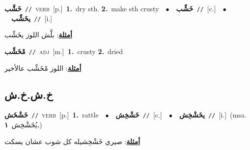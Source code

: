 \documentclass[10pt,a4paper,twoside]{article} %
\begin{document}
\begin{multicols}{2}
{\setlength\topsep{0pt}\textbf{\foreignlanguage{arabic}{خَشَّب}}\ {\color{gray}\texttt{//}\color{black}}\ \textsc{verb}\ [p.]\ \textbf{1.}~dry sth.  \textbf{2.}~make sth crusty\ \ $\bullet$\ \ \setlength\topsep{0pt}\textbf{\foreignlanguage{arabic}{خَشِّب}}\ {\color{gray}\texttt{//}\color{black}}\ [c.]\ \ $\bullet$\ \ \setlength\topsep{0pt}\textbf{\foreignlanguage{arabic}{يخَشِّب}}\ {\color{gray}\texttt{//}\color{black}}\ [i.]\  \begin{flushright}\color{gray}\foreignlanguage{arabic}{\textbf{\underline{\foreignlanguage{arabic}{أمثلة}}}: بلَّش اللوز يخَشِّب}\end{flushright}\color{black}} \vspace{2mm}

{\setlength\topsep{0pt}\textbf{\foreignlanguage{arabic}{مْخَشِّب}}\ {\color{gray}\texttt{//}\color{black}}\ \textsc{adj}\ [m.]\ \textbf{1.}~crusty  \textbf{2.}~dried\  \begin{flushright}\color{gray}\foreignlanguage{arabic}{\textbf{\underline{\foreignlanguage{arabic}{أمثلة}}}: اللوز مْخَشِّب عالأخير}\end{flushright}\color{black}} \vspace{2mm}

\vspace{-3mm}
\subsection*{\color{blue}\foreignlanguage{arabic}{خ.ش.خ.ش}\color{blue}{}} 

{\setlength\topsep{0pt}\textbf{\foreignlanguage{arabic}{خَشْخَش}}\ {\color{gray}\texttt{//}\color{black}}\ \textsc{verb}\ [p.]\ \textbf{1.}~rattle\ \ $\bullet$\ \ \setlength\topsep{0pt}\textbf{\foreignlanguage{arabic}{خَشْخِش}}\ {\color{gray}\texttt{//}\color{black}}\ [c.]\ \ $\bullet$\ \ \setlength\topsep{0pt}\textbf{\foreignlanguage{arabic}{يخَشْخِش}}\ {\color{gray}\texttt{//}\color{black}}\ [i.]\ \color{gray}(msa. \foreignlanguage{arabic}{يُخَشْخِش}~\foreignlanguage{arabic}{\textbf{١.}})\color{black}\  \begin{flushright}\color{gray}\foreignlanguage{arabic}{\textbf{\underline{\foreignlanguage{arabic}{أمثلة}}}: صيري خَشْخِشيله كل شوب عشان يسكت}\end{flushright}\color{black}} \vspace{2mm}


\end{multicols}
\end{document}

